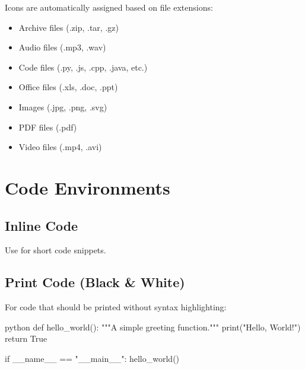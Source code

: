 \documentclass[11pt,letterpaper]{article}
\begin{document}
\begin{filetree}
    \label{tree:example}
    \begin{ptdirtree}
    \end{ptdirtree}
\end{filetree}

Icons are automatically assigned based on file extensions:
\begin{itemize}
    \item Archive files (.zip, .tar, .gz)
    \item Audio files (.mp3, .wav)
    \item Code files (.py, .js, .cpp, .java, etc.)
    \item Office files (.xls, .doc, .ppt)
    \item Images (.jpg, .png, .svg)
    \item PDF files (.pdf)
    \item Video files (.mp4, .avi)
\end{itemize}

\section{Code Environments}

\subsection{Inline Code}

Use  for short code snippets.

\subsection{Print Code (Black \& White)}

For code that should be printed without syntax highlighting:

\begin{ptprintcode}{python}
    def hello_world():
    """A simple greeting function."""
    print("Hello, World!")
    return True

    if __name__ == "__main__":
    hello_world()
\end{ptprintcode}
\end{document}
